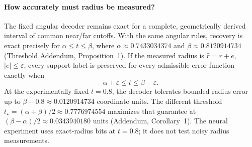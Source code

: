 \paragraph{How accurately must radius be measured?}
The fixed angular decoder remains exact for a complete, geometrically derived interval of common near/far cutoffs. With the same angular rules, recovery is exact precisely for $\alpha\leq t\leq\beta$, where $\alpha\approx0.7433034374$ and $\beta\approx0.8120914734$ (Threshold Addendum, Proposition~1). If the measured radius is $\widehat r=r+e$, $|e|\leq\varepsilon$, every support label is preserved for every admissible error function exactly when
\begin{equation}
\alpha+\varepsilon\leq t\leq\beta-\varepsilon.
\label{eq:radius-error}
\end{equation}
At the experimentally fixed $t=0.8$, the decoder tolerates bounded radius error up to $\beta-0.8\approx0.0120914734$ coordinate units. The different threshold $t_\star=(\alpha+\beta)/2\approx0.7776974554$ maximizes that guarantee at $(\beta-\alpha)/2\approx0.0343940180$ units (Addendum, Corollary~1). The neural experiment uses exact-radius bits at $t=0.8$; it does not test noisy radius measurements.
